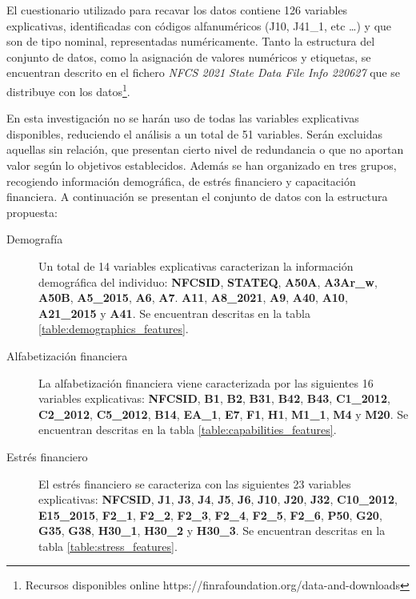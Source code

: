 \documentclass[a4paper, 11pt]{article}
\begin{document}
El cuestionario utilizado para recavar los datos contiene 126 variables explicativas, identificadas con códigos 
alfanuméricos (J10, J41\_1, etc \dots) y que son de tipo nominal, representadas numéricamente. Tanto la estructura
del conjunto de datos, como la asignación de valores numéricos y etiquetas, se encuentran descrito en el fichero 
\textit{NFCS 2021 State Data File Info 220627} que se distribuye con los datos\footnote{Recursos disponibles online https://finrafoundation.org/data-and-downloads}. 

En esta investigación no se harán uso de todas las variables explicativas disponibles, reduciendo el análisis a un total de 51 variables. Serán excluidas aquellas sin relación, que presentan cierto nivel de redundancia o que no aportan valor según lo
objetivos establecidos. Además se han organizado en tres grupos, recogiendo información demográfica, de estrés financiero y
capacitación financiera. A continuación se presentan el conjunto de datos con la estructura propuesta:
\begin{description}
    \item[Demografía] Un total de 14 variables explicativas caracterizan la información demográfica del individuo: \textbf{NFCSID},
    \textbf{STATEQ}, \textbf{A50A}, \textbf{A3Ar\_w}, \textbf{A50B}, \textbf{A5\_2015}, \textbf{A6}, \textbf{A7}. \textbf{A11},
    \textbf{A8\_2021}, \textbf{A9}, \textbf{A40}, \textbf{A10}, \textbf{A21\_2015} y \textbf{A41}. Se encuentran descritas
    en la tabla \ref{table:demographics_features}.
    \item[Alfabetización financiera] La alfabetización financiera viene caracterizada por las siguientes 16 variables explicativas:
    \textbf{NFCSID}, \textbf{B1}, \textbf{B2}, \textbf{B31}, \textbf{B42}, \textbf{B43}, \textbf{C1\_2012}, \textbf{C2\_2012},
    \textbf{C5\_2012}, \textbf{B14}, \textbf{EA\_1}, \textbf{E7}, \textbf{F1}, \textbf{H1}, \textbf{M1\_1}, \textbf{M4} y
    \textbf{M20}. Se encuentran descritas en la tabla \ref{table:capabilities_features}.
    \item[Estrés financiero] El estrés financiero se caracteriza con las siguientes 23 variables explicativas: \textbf{NFCSID},
    \textbf{J1}, \textbf{J3}, \textbf{J4}, \textbf{J5}, \textbf{J6}, \textbf{J10}, \textbf{J20}, \textbf{J32}, \textbf{C10\_2012},
    \textbf{E15\_2015}, \textbf{F2\_1}, \textbf{F2\_2}, \textbf{F2\_3}, \textbf{F2\_4}, \textbf{F2\_5}, \textbf{F2\_6}, 
    \textbf{P50}, \textbf{G20}, \textbf{G35}, \textbf{G38}, \textbf{H30\_1}, \textbf{H30\_2} y \textbf{H30\_3}.
    Se encuentran descritas en la tabla \ref{table:stress_features}.
\end{description}
\end{document}
